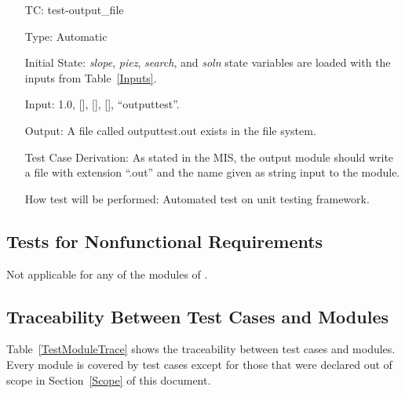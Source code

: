 \documentclass[12pt, titlepage]{article}
\newcounter{utestnum} %
\begin{document}
\begin{enumerate}[label=TC\arabic*:,ref={\arabic*}]
	
	\item [TC\refstepcounter{utestnum}\theutestnum: \label{TC_OutputFile}] 
	test-output\_file
	
	Type: Automatic
	
	Initial State: \textit{slope}, \textit{piez}, \textit{search}, and 
	\textit{soln} state variables are loaded with the inputs from 
	Table~\ref{Inputs}.
	
	Input: 1.0, [], [], [], ``outputtest''.
	
	Output: A file called outputtest.out exists in the file system.
	
	Test Case Derivation: As stated in the MIS, the output module should write 
	a file with extension ``.out'' and the name given as string input to the 
	module.
	
	How test will be performed: Automated test on unit testing framework.
	
\end{enumerate}

\subsection{Tests for Nonfunctional Requirements}

Not applicable for any of the modules of \progname{}.

\subsection{Traceability Between Test Cases and Modules}

Table~\ref{TestModuleTrace} shows the traceability between test cases and 
modules. Every module is covered by test cases except for those that were 
declared out of scope in Section~\ref{Scope} of this document.
\end{document}
